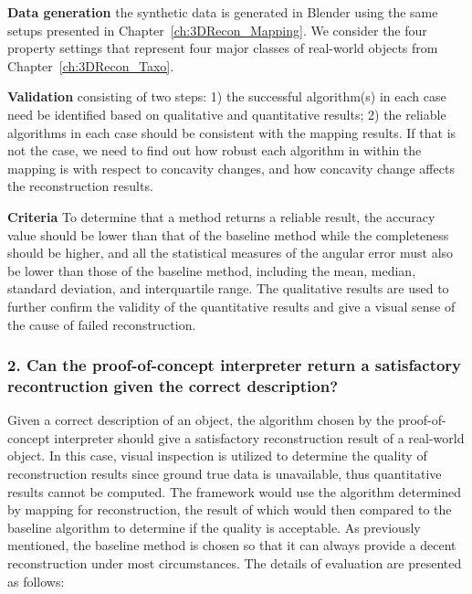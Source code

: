 \noindent\textbf{Data generation} the synthetic data is generated in Blender using the same setups presented in Chapter~\ref{ch:3DRecon_Mapping}. We consider the four property settings that represent four major classes of real-world objects from Chapter~\ref{ch:3DRecon_Taxo}.


\noindent\textbf{Validation} consisting of two steps: 1) the successful algorithm(s) in each case need be identified based on qualitative and quantitative results; 2) the reliable algorithms in each case should be consistent with the mapping results. If that is not the case, we need to find out how robust each algorithm in within the mapping is with respect to concavity changes, and how concavity change affects the reconstruction results.

\noindent\textbf{Criteria} To determine that a method returns a reliable result, the accuracy value should be lower than that of the baseline method while the completeness should be higher, and all the statistical measures of the angular error must also be lower than those of the baseline method, including the mean, median, standard deviation, and interquartile range. The qualitative results are used to further confirm the validity of the quantitative results and give a visual sense of the cause of failed reconstruction.

\subsubsection{2. Can the proof-of-concept interpreter return a satisfactory recontruction given the correct description?}
Given a correct description of an object, the algorithm chosen by the proof-of-concept interpreter should give a satisfactory reconstruction result of a real-world object. In this case, visual inspection is utilized to determine the quality of reconstruction results since ground true data is unavailable, thus quantitative results cannot be computed. The framework would use the algorithm determined by mapping for reconstruction, the result of which would then compared to the baseline algorithm to determine if the quality is acceptable. As previously mentioned, the baseline method is chosen so that it can always provide a decent reconstruction under most circumstances. The details of evaluation are presented as follows:

